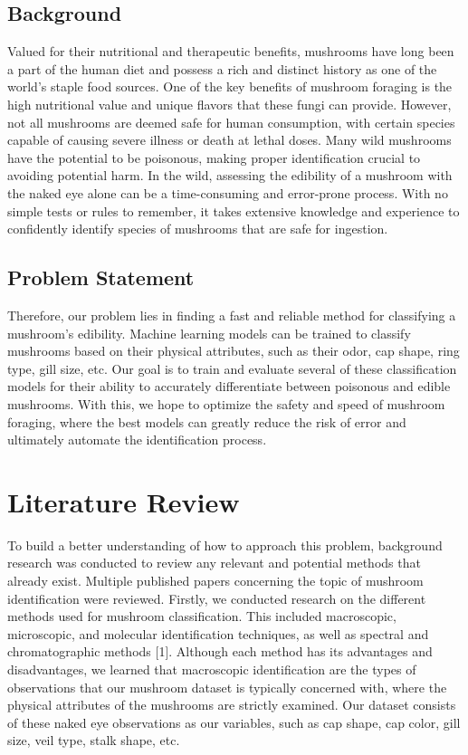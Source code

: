 \documentclass[11pt, conference]{IEEEtran}
\begin{document}
    \subsection{Background}
    Valued for their nutritional and therapeutic benefits, mushrooms have long been a part of the human diet and possess a rich and distinct history as one of the world's staple food sources. One of the key benefits of mushroom foraging is the high nutritional value and unique flavors that these fungi can provide. However, not all mushrooms are deemed safe for human consumption, with certain species capable of causing severe illness or death at lethal doses. Many wild mushrooms have the potential to be poisonous, making proper identification crucial to avoiding potential harm. In the wild, assessing the edibility of a mushroom with the naked eye alone can be a time-consuming and error-prone process. With no simple tests or rules to remember, it takes extensive knowledge and experience to confidently identify species of mushrooms that are safe for ingestion.

    \subsection{Problem Statement}
    Therefore, our problem lies in finding a fast and reliable method for classifying a mushroom's edibility. Machine learning models can be trained to classify mushrooms based on their physical attributes, such as their odor, cap shape, ring type, gill size, etc. Our goal is to train and evaluate several of these classification models for their ability to accurately differentiate between poisonous and edible mushrooms. With this, we hope to optimize the safety and speed of mushroom foraging, where the best models can greatly reduce the risk of error and ultimately automate the identification process.
    
\section{Literature Review}
    To build a better understanding of how to approach this problem, background research was conducted to review any relevant and potential methods that already exist. Multiple published papers concerning the topic of mushroom identification were reviewed. Firstly, we conducted research on the different methods used for mushroom classification. This included macroscopic, microscopic, and molecular identification techniques, as well as spectral and chromatographic methods [1]. Although each method has its advantages and disadvantages, we learned that macroscopic identification are the types of observations that our mushroom dataset is typically concerned with, where the physical attributes of the mushrooms are strictly examined. Our dataset consists of these naked eye observations as our variables, such as cap shape, cap color, gill size, veil type, stalk shape, etc.
    
\end{document}
